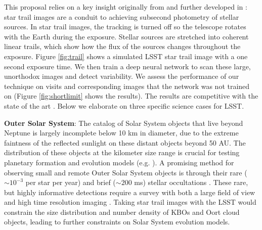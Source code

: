 \documentclass[12pt, letterpaper]{article}
\begin{document}
This proposal relies on a key insight originally from \cite{1986PASP...98..802H} and further developed in \cite{mine}: star trail images are a conduit to achieving subsecond photometry of stellar sources. In star trail images, the tracking is turned off so the telescope rotates with the Earth during the exposure. Stellar sources are stretched into coherent linear trails, which show how the flux of the sources changes throughout the exposure. Figure \ref{fig:trail} shows a simulated LSST star trail image with a one second exposure time. We then train a deep neural network to scan these large, unorthodox images and detect variability. We assess the performance of our technique on visits and corresponding images that the network was not trained on (Figure \ref{fig:shortlimit} shows the results). The results are competitive with the state of the art \citep{2016SPIE.9908E..0YD}. Below we elaborate on three specific science cases for LSST.


{\bf Outer Solar System}: The catalog of Solar System objects that live beyond Neptune is largely incomplete below 10 km in diameter, due to the extreme faintness of the reflected sunlight on these distant objects beyond 50 AU. The distribution of these objects at the kilometer size range is crucial for testing planetary formation and evolution models (e.g. \citealt{Kenyon04}). A promising method for observing small and remote Outer Solar System objects is through their rare ($\sim10^{-3}$ per star per year) and brief ($\sim200$ ms) stellar occultations \citep{2013AJ....146...14Z}. These rare, but highly informative detections require a survey with both a large field of view and high time resolution imaging \citep{Bianco09}. Taking star trail images with the LSST would constrain the size distribution and number density of KBOs and Oort cloud objects, leading to further constraints on Solar System evolution models.
\end{document}
